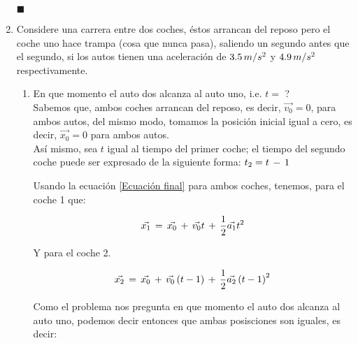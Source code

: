 \documentclass[letterpaper, 12pt]{article}
\begin{document}
\begin{enumerate}
    \begin{flushright}
         $\blacksquare$
    \end{flushright}
     
    \item Considere una carrera entre dos coches, éstos arrancan del reposo pero el coche uno hace trampa (cosa que nunca pasa), saliendo un segundo antes que el segundo, si los autos tienen una aceleración de $3.5 \thinspace m/s^2$ y $4.9 \thinspace m/s^2$ respectivamente.
    
        \begin{enumerate}
            \item En que momento el auto dos alcanza al auto uno, i.e. $t =$ \thinspace ? \\
            
            Sabemos que, ambos coches arrancan del reposo, es decir, $\vec{v_{0}} = 0$, para ambos autos, del mismo modo, tomamos la posición inicial igual a cero, es decir, $\vec{x_{0}} = 0$ para ambos autos.\\
            
            Así mismo, sea $t$ igual al tiempo del primer coche; el tiempo del segundo coche puede ser expresado de la siguiente forma: $t_{2} = t \thinspace - \thinspace 1$
            
            Usando la ecuación \ref{Ecuación final} para ambos coches, tenemos, para el coche 1 que:
            
            \begin{equation}
                \label{Ecuación para el primer carro}
                \vec{x_{1}} \thinspace  = \thinspace \vec{x_{0}} \thinspace + \thinspace \vec{v_{0}} t  \thinspace + \thinspace \frac{1}{2}\vec{a_{1}} t^2
            \end{equation}
            
            Y para el coche 2.
            
            \begin{equation}
                \label{Ecuación para el segundo carro}
                \vec{x_{2}} \thinspace  = \thinspace \vec{x_{0}} \thinspace + \thinspace \vec{v_{0}} \left(t-1 \right)  \thinspace + \thinspace \frac{1}{2}\vec{a_{2}} \left(t-1 \right)^2
            \end{equation}
            
            Como el problema nos pregunta en que momento el auto dos alcanza al auto uno, podemos decir entonces que ambas posisciones son iguales, es decir:
            

\end{enumerate}
\end{enumerate}
\end{document}
